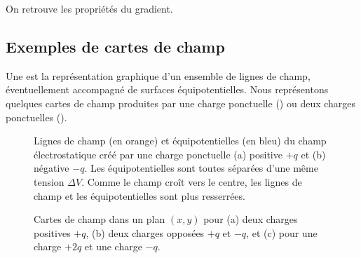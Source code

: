 \documentclass[12pt,fancy]{/Users/victor/Documents/COURS/2ACapECL/texmf/tex/latex/Preambles/cours}
\begin{document}
\begin{remarque}
On retrouve les propriétés du gradient.
\end{remarque}

\subsection{Exemples de cartes de champ}

Une  est la représentation graphique d’un ensemble de lignes de champ, éventuellement accompagné de surfaces équipotentielles. Nous représentons quelques cartes de champ produites par une charge ponctuelle () ou deux charges ponctuelles ().
 \begin{figure}[h!]
\centering
{}
\caption{Lignes de champ (en orange) et équipotentielles (en bleu) du champ électrostatique créé par une charge ponctuelle (a) positive $+q$ et (b) négative $-q$. Les équipotentielles sont toutes séparées d’une même tension $\Delta V$. Comme le champ croît vers le centre, les lignes de champ et les équipotentielles sont plus resserrées.
}
\label{fig:1q}
\end{figure}
\begin{figure}[h!]
\centering
{}
\caption{Cartes de champ dans un plan $(x,y)$ pour (a) deux charges positives $+q$, (b) deux charges opposées $+q$ et $-q$, et (c) pour une charge $+2q$ et une charge $-q$.}
\label{fig:2q}
\end{figure}
\end{document}

